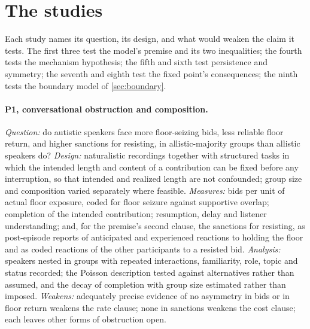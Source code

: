 \section{The studies}\label{sec:predictions}

Each study names its question, its design, and what would weaken the claim it tests. The first three test the model's premise and its two inequalities; the fourth tests the mechanism hypothesis; the fifth and sixth test persistence and symmetry; the seventh and eighth test the fixed point's consequences; the ninth tests the boundary model of \autoref{sec:boundary}.

\paragraph{P1, conversational obstruction and composition.} \emph{Question:} do autistic speakers face more floor-seizing bids, less reliable floor return, and higher sanctions for resisting, in allistic-majority groups than allistic speakers do? \emph{Design:} naturalistic recordings together with structured tasks in which the intended length and content of a contribution can be fixed before any interruption, so that intended and realized length are not confounded; group size and composition varied separately where feasible. \emph{Measures:} bids per unit of actual floor exposure, coded for floor seizure against supportive overlap; completion of the intended contribution; resumption, delay and listener understanding; and, for the premise's second clause, the sanctions for resisting, as post-episode reports of anticipated and experienced reactions to holding the floor and as coded reactions of the other participants to a resisted bid. \emph{Analysis:} speakers nested in groups with repeated interactions, familiarity, role, topic and status recorded; the Poisson description tested against alternatives rather than assumed, and the decay of completion with group size estimated rather than imposed. \emph{Weakens:} adequately precise evidence of no asymmetry in bids or in floor return weakens the rate clause; none in sanctions weakens the cost clause; each leaves other forms of obstruction open.

